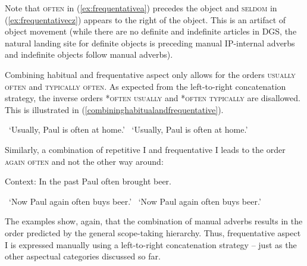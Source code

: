 \noindent Note that \textsc{often} in (\ref{ex:frequentativea}) precedes the object and \textsc{seldom} in (\ref{ex:frequentativecz}) appears to the right of the object. This is an artifact of object movement (while there are no definite and indefinite articles in DGS, the natural landing site for definite objects is preceding manual IP-internal adverbs and indefinite objects follow manual adverbs). 

Combining habitual and frequentative aspect only allows for the orders \textsc{usually often} and \textsc{typically often}. As expected from the left-to-right concatenation strategy, the inverse orders *\textsc{often usually} and *\textsc{often typically} are disallowed. This is illustrated in (\ref{combininghabitualandfrequentative}). 




\begin{exe}
\ex\label{combininghabitualandfrequentative}\begin{xlist} 
\glt \textcolor{white}{*}`Usually, Paul is often at home.' \label{ex:frequentativec}
\glt \textcolor{white}{*}`Usually, Paul is often at home.'  \label{ex:frequentatived}
\end{xlist}
\end{exe} 

\noindent Similarly, a combination of repetitive I and frequentative I leads to the order \textsc{again often} and not the other way around: 

\begin{exe}
\ex Context: In the past Paul often brought beer. \label{combininghabitualandfrequentative}\begin{xlist} 
\glt \textcolor{white}{*}`Now Paul again often buys beer.' \label{ex:frequentativec}
\glt \textcolor{white}{*}`Now Paul again often buys beer.'  \label{ex:frequentatived}
\end{xlist}
\end{exe} 

\noindent The examples show, again, that the combination of manual adverbs results in the order predicted by the general scope-taking hierarchy. Thus, frequentative aspect I is expressed manually using a left-to-right concatenation strategy -- just as the other aspectual categories discussed so far.




